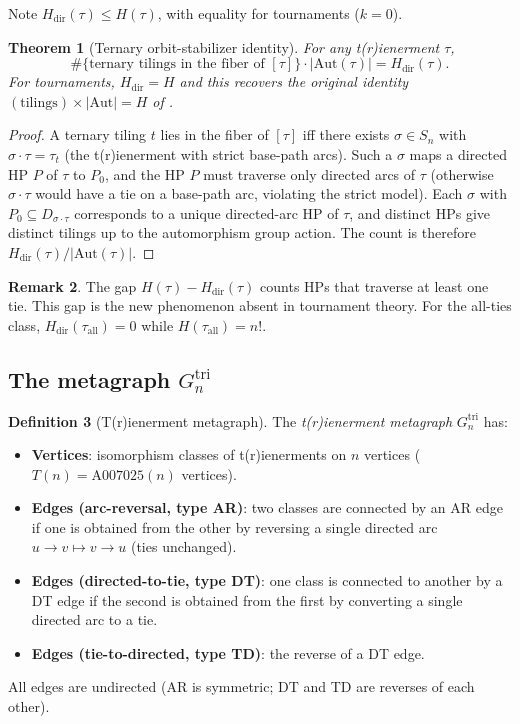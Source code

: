 \documentclass[12pt,reqno]{amsart}
\newtheorem{theorem}{Theorem}[section]
\theoremstyle{definition}
\newtheorem{definition}[theorem]{Definition}
\newtheorem{remark}[theorem]{Remark}
\theoremstyle{plain}
\begin{document}
Note $H_{\mathrm{dir}}(\tau)\le H(\tau)$, with equality for tournaments ($k=0$).

\begin{theorem}[Ternary orbit-stabilizer identity]\label{thm:tiling-OS}
For any t(r)ienerment $\tau$,
\[
  \#\{\text{ternary tilings in the fiber of }[\tau]\}\cdot|\mathrm{Aut}(\tau)|
  = H_{\mathrm{dir}}(\tau).
\]
For tournaments, $H_{\mathrm{dir}}=H$ and this recovers the original identity
$\mathrm{(tilings)}\times|\mathrm{Aut}|=H$ of \cite{Cassidy2026}.
\end{theorem}

\begin{proof}
A ternary tiling $t$ lies in the fiber of $[\tau]$ iff there exists $\sigma\in S_n$
with $\sigma\cdot\tau=\tau_t$ (the t(r)ienerment with strict base-path arcs).
Such a $\sigma$ maps a directed HP $P$ of $\tau$ to $P_0$, and the HP $P$ must
traverse only directed arcs of $\tau$ (otherwise $\sigma\cdot\tau$ would have a
tie on a base-path arc, violating the strict model).
Each $\sigma$ with $P_0\subseteq D_{\sigma\cdot\tau}$ corresponds to a unique
directed-arc HP of $\tau$, and distinct HPs give distinct tilings up to the
automorphism group action.  The count is therefore $H_{\mathrm{dir}}(\tau)/|\mathrm{Aut}(\tau)|$.
\end{proof}

\begin{remark}
The gap $H(\tau)-H_{\mathrm{dir}}(\tau)$ counts HPs that traverse at least one tie.
This gap is the new phenomenon absent in tournament theory.  For the all-ties
class, $H_{\mathrm{dir}}(\tau_{\mathrm{all}})=0$ while $H(\tau_{\mathrm{all}})=n!$.
\end{remark}

\subsection{The metagraph \texorpdfstring{$G_n^{\mathrm{tri}}$}{G\_n\^tri}}
\label{ssec:metagraph}

\begin{definition}[T(r)ienerment metagraph]
The \emph{t(r)ienerment metagraph} $G_n^{\mathrm{tri}}$ has:
\begin{itemize}
\item \textbf{Vertices}: isomorphism classes of t(r)ienerments on $n$ vertices
  ($T(n)=\mathrm{A007025}(n)$ vertices).
\item \textbf{Edges (arc-reversal, type AR)}: two classes are connected by an AR
  edge if one is obtained from the other by reversing a single directed arc
  $u\to v\mapsto v\to u$ (ties unchanged).
\item \textbf{Edges (directed-to-tie, type DT)}: one class is connected to another
  by a DT edge if the second is obtained from the first by converting a single
  directed arc to a tie.
\item \textbf{Edges (tie-to-directed, type TD)}: the reverse of a DT edge.
\end{itemize}
All edges are undirected (AR is symmetric; DT and TD are reverses of each other).
\end{definition}
\end{document}
